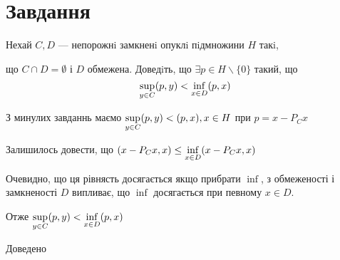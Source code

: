 
\chapter{Завдання \theHchapter}


\begin{tcolorbox}[title=Завдання]
    
    Нехай $C, D$ — непорожнi замкненi опуклi пiдмножини 
    $H$ такi, 
    
    
    що $ C \cap D = \emptyset$ і $D$ обмежена.
    Доведiть, що $ \exists p \in H \backslash \{0\} $
    такий, що
    $$ \displaystyle\sup_{y \in C} (p, y) < \displaystyle\inf_{x \in D} (p, x) $$

    
\end{tcolorbox}



З минулих завданнь маємо $\displaystyle\sup_{y \in C} (p, y) < (p, x), x \in H $ при 
$ p = x - P_Cx $

Залишилось довести, що $ (x - P_Cx, x) \le \displaystyle\inf_{x \in D} (x - P_Cx, x) $


Очевидно, що ця рівнясть досягається якщо прибрати $\inf$, з обмеженості і 
замкненості $D$  випливає, що $\inf $ досягається при певному $x \in D$.


Отже 
$ \displaystyle\sup_{y \in C} (p, y) < \displaystyle\inf_{x \in D} (p, x) $


Доведено
